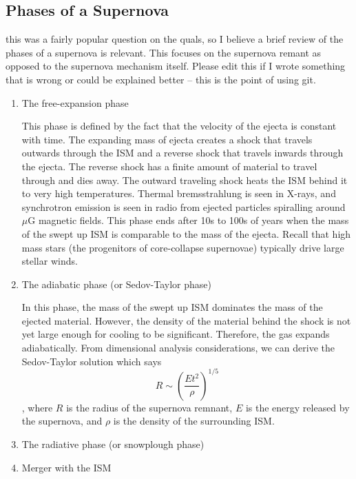 \subsection{Phases of a Supernova}
 this was a fairly popular question on the quals, so
I believe a brief review of the phases of a supernova is relevant.  This focuses on the
supernova remant as opposed to the supernova mechanism itself.  Please edit this if I wrote
something that is wrong or could be explained better -- this is the point of using git.
\begin{enumerate}
    \item The free-expansion phase

    This phase is defined by the fact that the velocity of the ejecta is constant with time.
    The expanding mass of ejecta creates a shock that travels outwards through the ISM
    and a reverse shock that travels inwards through the ejecta.  The reverse shock has a finite
    amount of material to travel through and dies away.
    The outward traveling shock heats the ISM behind it to very high temperatures.
    Thermal bremsstrahlung is seen
    in X-rays, and synchrotron emission is seen in radio from ejected
    particles spiralling around $\mu$G magnetic fields.  This phase ends after 10s to 100s of
    years when the mass of the swept up ISM is comparable to the mass of the ejecta.
    Recall that high mass stars (the progenitors of core-collapse supernovae) typically
    drive large stellar winds.

    \item The adiabatic phase (or Sedov-Taylor phase)

    In this phase, the mass of the swept up ISM dominates the mass of the ejected material.
    However, the density of the material behind the shock is not yet large enough for cooling
    to be significant.  Therefore, the gas expands adiabatically.
    From dimensional analysis considerations, we can derive the Sedov-Taylor solution which says
    \begin{dmath}
        R \sim \left(\frac{Et^2}{\rho}\right)^{1/5}
    \end{dmath},
    where $R$ is the radius of the supernova remnant, $E$ is the energy released by the
    supernova, and $\rho$ is the density of the surrounding ISM.

    \item The radiative phase (or snowplough phase)
    \item Merger with the ISM
\end{enumerate}


